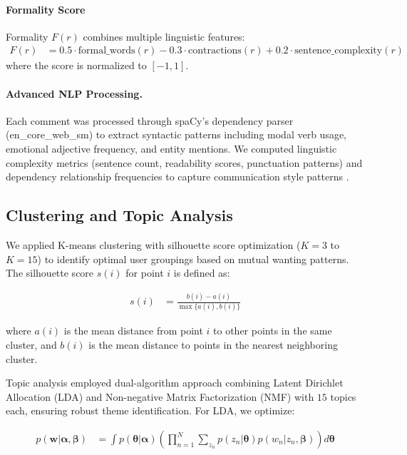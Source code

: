 \documentclass{article}
\begin{document}
\paragraph{Formality Score} Formality $F(r)$ combines multiple linguistic features:
\begin{align}
F(r) &= 0.5 \cdot \text{formal\_words}(r) - 0.3 \cdot \text{contractions}(r) + 0.2 \cdot \text{sentence\_complexity}(r) \label{eq:formality}
\end{align}
where the score is normalized to $[-1,1]$.

\paragraph{Advanced NLP Processing.}
Each comment was processed through spaCy's dependency parser (en\_core\_web\_sm) to extract syntactic patterns including modal verb usage, emotional adjective frequency, and entity mentions. We computed linguistic complexity metrics (sentence count, readability scores, punctuation patterns) and dependency relationship frequencies to capture communication style patterns \citep{artstein2008agreement, krippendorff2013content}.

\subsection{Clustering and Topic Analysis}

We applied K-means clustering with silhouette score optimization ($K=3$ to $K=15$) to identify optimal user groupings based on mutual wanting patterns. The silhouette score $s(i)$ for point $i$ is defined as:

\begin{align}
s(i) &= \frac{b(i) - a(i)}{\max\{a(i), b(i)\}} \label{eq:silhouette}
\end{align}

where $a(i)$ is the mean distance from point $i$ to other points in the same cluster, and $b(i)$ is the mean distance to points in the nearest neighboring cluster.

Topic analysis employed dual-algorithm approach combining Latent Dirichlet Allocation (LDA) and Non-negative Matrix Factorization (NMF) with $15$ topics each, ensuring robust theme identification. For LDA, we optimize:

\begin{align}
p(\mathbf{w}|\boldsymbol{\alpha}, \boldsymbol{\beta}) &= \int p(\boldsymbol{\theta}|\boldsymbol{\alpha}) \left(\prod_{n=1}^{N} \sum_{z_n} p(z_n|\boldsymbol{\theta}) p(w_n|z_n, \boldsymbol{\beta})\right) d\boldsymbol{\theta} \label{eq:lda}
\end{align}
\end{document}
